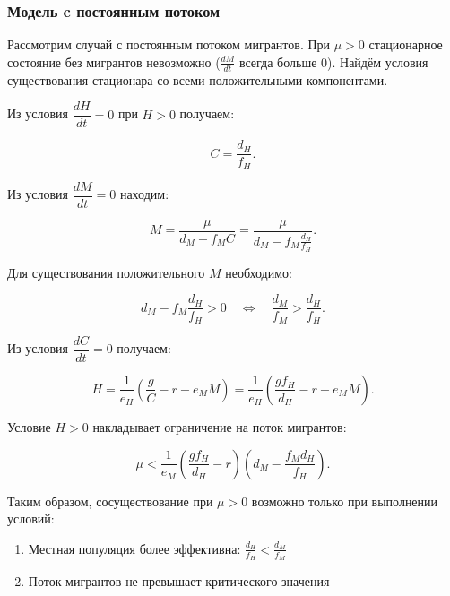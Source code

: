 \documentclass[a4paper, 14pt]{extarticle}
\begin{document}
\subsubsection{Модель c постоянным потоком}

Рассмотрим случай с постоянным потоком мигрантов. При $\mu > 0$ стационарное состояние без мигрантов невозможно ($\frac{dM}{dt}$ всегда больше 0). Найдём условия существования стационара со всеми положительными компонентами.

Из условия $\dfrac{dH}{dt}=0$ при $H > 0$ получаем:

\begin{equation}
    C = \frac{d_H}{f_H}.
\end{equation}

Из условия $\dfrac{dM}{dt}=0$ находим:

\begin{equation}
    M = \frac{\mu}{d_M - f_M C} = \frac{\mu}{d_M - f_M \frac{d_H}{f_H}}.
\end{equation}

Для существования положительного $M$ необходимо:

\begin{equation}
    d_M - f_M \frac{d_H}{f_H} > 0 \quad \Longleftrightarrow \quad \frac{d_M}{f_M} > \frac{d_H}{f_H}.
\end{equation}

Из условия $\dfrac{dC}{dt}=0$ получаем:

\begin{equation}
    H = \frac{1}{e_H}\left( \frac{g}{C} - r - e_M M \right) = \frac{1}{e_H}\left( \frac{g f_H}{d_H} - r - e_M M \right).
\end{equation}

Условие $H > 0$ накладывает ограничение на поток мигрантов:

\begin{equation}
    \mu < \frac{1}{e_M} \left( \frac{g f_H}{d_H} - r \right) \left( d_M - \frac{f_M d_H}{f_H} \right).
\end{equation}

Таким образом, сосуществование при $\mu > 0$ возможно только при выполнении условий:

\begin{enumerate}
    \item Местная популяция более эффективна: $\frac{d_H}{f_H} < \frac{d_M}{f_M}$
    \item Поток мигрантов не превышает критического значения
\end{enumerate}
\end{document}
